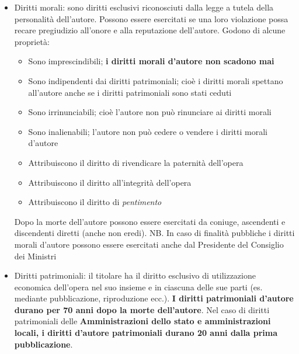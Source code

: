 \begin{itemize}
    \item Diritti morali: sono diritti esclusivi riconosciuti dalla legge a tutela della
    personalità dell'autore. Possono essere esercitati se una loro violazione possa recare pregiudizio
    all'onore e alla reputazione dell'autore. Godono di alcune proprietà:
    \begin{itemize}
        \item Sono imprescindibili; \textbf{i diritti morali d'autore non scadono mai}
        \item Sono indipendenti dai diritti patrimoniali; cioè i diritti morali
        spettano all'autore anche se i diritti patrimoniali sono stati ceduti
        \item Sono irrinunciabili; cioè l'autore non può rinunciare ai diritti morali
        \item Sono inalienabili; l'autore non può cedere o vendere i diritti morali d'autore
        \item Attribuiscono il diritto di rivendicare la paternità dell'opera
        \item Attribuiscono il diritto all'integrità dell'opera
        \item Attribuiscono il diritto di \textit{pentimento}
    \end{itemize}
    Dopo la morte dell'autore possono essere esercitati da coniuge, ascendenti e discendenti diretti
    (anche non eredi).\newline
    NB. In caso di finalità pubbliche i diritti morali d'autore possono essere esercitati
    anche dal Presidente del Consiglio dei Ministri
    \item Diritti patrimoniali: il titolare ha il diritto esclusivo di utilizzazione economica
    dell'opera nel suo insieme e in ciascuna delle sue parti (es. mediante pubblicazione, riproduzione ecc.). \newline
    \textbf{I diritti patrimoniali d'autore durano per 70 anni dopo la morte dell'autore}.\newline
    Nel caso di diritti patrimoniali delle \textbf{Amministrazioni dello stato e amministrazioni
    locali, i diritti d'autore patrimoniali durano 20 anni dalla prima pubblicazione}.
\end{itemize}

